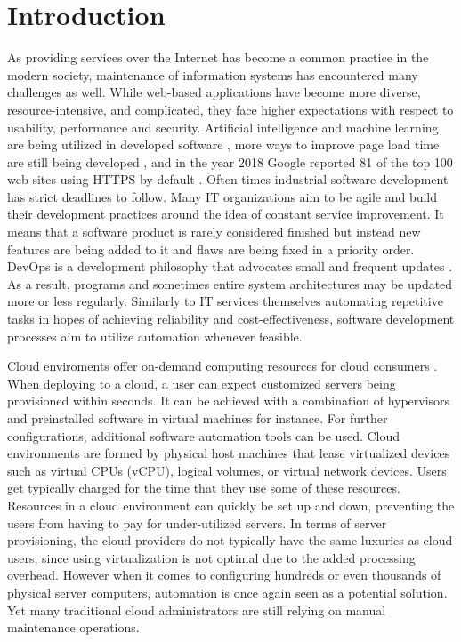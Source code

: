 \chapter{Introduction}

As providing services over the Internet has become a common practice in the
modern society, maintenance of information systems has encountered many
challenges as well. While web-based applications have become more diverse,
resource-intensive, and complicated, they face higher expectations with respect
to usability, performance and security. Artificial intelligence and machine
learning are being utilized in developed software
\cite{softwareengineeringfor-machine-learning}, more ways to improve page load
time are still being developed \cite{pageloadtimes}, and in the year 2018
Google reported 81 of the top 100 web sites using HTTPS by default
\cite{secure-web}. Often times industrial software development has strict
deadlines to follow. Many IT organizations aim to be agile and build their
development practices around the idea of constant service improvement. It means
that a software product is rarely considered finished but instead new features
are being added to it and flaws are being fixed in a priority order. DevOps is
a development philosophy that advocates small and frequent updates
\cite{wiedemann2019devops}. As a result, programs and sometimes entire system
architectures may be updated more or less regularly. Similarly to IT services
themselves automating repetitive tasks in hopes of achieving reliability and
cost-effectiveness, software development processes aim to utilize automation
whenever feasible.

Cloud enviroments offer on-demand computing resources for cloud consumers
\cite{armbrust2010view}. When deploying to a cloud, a user can expect
customized servers being provisioned within seconds. It can be achieved with a
combination of hypervisors and preinstalled software in virtual machines for
instance. For further configurations, additional software automation tools can
be used. Cloud environments are formed by physical host machines that lease
virtualized devices such as virtual CPUs (vCPU), logical volumes, or virtual
network devices. Users get typically charged for the time that they use some of
these resources. Resources in a cloud environment can quickly be set up and
down, preventing the users from having to pay for under-utilized servers. In
terms of server provisioning, the cloud providers do not typically have the
same luxuries as cloud users, since using virtualization is not optimal due to
the added processing overhead. However when it comes to configuring hundreds or
even thousands of physical server computers, automation is once again seen as a
potential solution. Yet many traditional cloud administrators are still relying
on manual maintenance operations.


